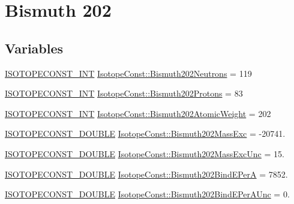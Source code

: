 \hypertarget{group___isotope_const-_bismuth-_bi202}{}\section{Bismuth 202}
\label{group___isotope_const-_bismuth-_bi202}
\subsection*{Variables}
\begin{DoxyCompactItemize}
\item 
\mbox{\hyperlink{group___isotope_const-_macros_ga5f18360b3e99483a35c32d789e62621c}{I\+S\+O\+T\+O\+P\+E\+C\+O\+N\+S\+T\+\_\+\+I\+NT}} \mbox{\hyperlink{group___isotope_const-_bismuth-_bi202_ga0807b11eb6ae456fd50937543369301f}{Isotope\+Const\+::\+Bismuth202\+Neutrons}} = 119
\item 
\mbox{\hyperlink{group___isotope_const-_macros_ga5f18360b3e99483a35c32d789e62621c}{I\+S\+O\+T\+O\+P\+E\+C\+O\+N\+S\+T\+\_\+\+I\+NT}} \mbox{\hyperlink{group___isotope_const-_bismuth-_bi202_gad1fa578c352eecc64196492f2a3a8a4b}{Isotope\+Const\+::\+Bismuth202\+Protons}} = 83
\item 
\mbox{\hyperlink{group___isotope_const-_macros_ga5f18360b3e99483a35c32d789e62621c}{I\+S\+O\+T\+O\+P\+E\+C\+O\+N\+S\+T\+\_\+\+I\+NT}} \mbox{\hyperlink{group___isotope_const-_bismuth-_bi202_ga935d186044b8740c96069c34e0f82cb6}{Isotope\+Const\+::\+Bismuth202\+Atomic\+Weight}} = 202
\item 
\mbox{\hyperlink{group___isotope_const-_macros_ga8f45a7272ce02c0b4c65c44636ed719a}{I\+S\+O\+T\+O\+P\+E\+C\+O\+N\+S\+T\+\_\+\+D\+O\+U\+B\+LE}} \mbox{\hyperlink{group___isotope_const-_bismuth-_bi202_gaf16d0c6fffca051a97b789d8e0b8906a}{Isotope\+Const\+::\+Bismuth202\+Mass\+Exc}} = -\/20741.
\item 
\mbox{\hyperlink{group___isotope_const-_macros_ga8f45a7272ce02c0b4c65c44636ed719a}{I\+S\+O\+T\+O\+P\+E\+C\+O\+N\+S\+T\+\_\+\+D\+O\+U\+B\+LE}} \mbox{\hyperlink{group___isotope_const-_bismuth-_bi202_ga16e8d1099130f6627fdd1611388612e1}{Isotope\+Const\+::\+Bismuth202\+Mass\+Exc\+Unc}} = 15.
\item 
\mbox{\hyperlink{group___isotope_const-_macros_ga8f45a7272ce02c0b4c65c44636ed719a}{I\+S\+O\+T\+O\+P\+E\+C\+O\+N\+S\+T\+\_\+\+D\+O\+U\+B\+LE}} \mbox{\hyperlink{group___isotope_const-_bismuth-_bi202_gae4952972b6d0138dbd34d7687426f979}{Isotope\+Const\+::\+Bismuth202\+Bind\+E\+PerA}} = 7852.
\item 
\mbox{\hyperlink{group___isotope_const-_macros_ga8f45a7272ce02c0b4c65c44636ed719a}{I\+S\+O\+T\+O\+P\+E\+C\+O\+N\+S\+T\+\_\+\+D\+O\+U\+B\+LE}} \mbox{\hyperlink{group___isotope_const-_bismuth-_bi202_gac6dc2590c9222f727465e40ea6c0e8fe}{Isotope\+Const\+::\+Bismuth202\+Bind\+E\+Per\+A\+Unc}} = 0.

\end{DoxyCompactItemize}
